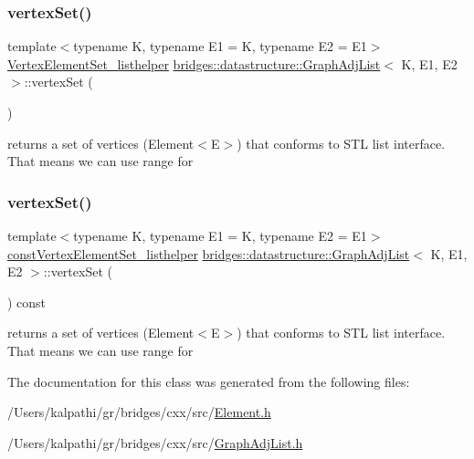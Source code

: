 \subsubsection{\texorpdfstring{vertexSet()}{vertexSet()}\hspace{0.1cm}{\footnotesize\ttfamily [1/2]}}
{\footnotesize\ttfamily template$<$typename K, typename E1 = K, typename E2 = E1$>$ \\
\mbox{\hyperlink{classbridges_1_1datastructure_1_1_graph_adj_list_1_1_vertex_element_set__listhelper}{Vertex\+Element\+Set\+\_\+listhelper}} \mbox{\hyperlink{classbridges_1_1datastructure_1_1_graph_adj_list}{bridges\+::datastructure\+::\+Graph\+Adj\+List}}$<$ K, E1, E2 $>$\+::vertex\+Set (\begin{DoxyParamCaption}{ }\end{DoxyParamCaption})\hspace{0.3cm}{\ttfamily [inline]}}



returns a set of vertices (Element$<$\+E$>$) that conforms to S\+TL list interface. That means we can use range for 

\mbox{\label{classbridges_1_1datastructure_1_1_graph_adj_list_a5ef96f5df21b2f9743b7bb79c10cf090}} 
\subsubsection{\texorpdfstring{vertexSet()}{vertexSet()}\hspace{0.1cm}{\footnotesize\ttfamily [2/2]}}
{\footnotesize\ttfamily template$<$typename K, typename E1 = K, typename E2 = E1$>$ \\
\mbox{\hyperlink{classbridges_1_1datastructure_1_1_graph_adj_list_1_1const_vertex_element_set__listhelper}{const\+Vertex\+Element\+Set\+\_\+listhelper}} \mbox{\hyperlink{classbridges_1_1datastructure_1_1_graph_adj_list}{bridges\+::datastructure\+::\+Graph\+Adj\+List}}$<$ K, E1, E2 $>$\+::vertex\+Set (\begin{DoxyParamCaption}{ }\end{DoxyParamCaption}) const\hspace{0.3cm}{\ttfamily [inline]}}



returns a set of vertices (Element$<$\+E$>$) that conforms to S\+TL list interface. That means we can use range for 



The documentation for this class was generated from the following files\+:\begin{DoxyCompactItemize}
\item 
/\+Users/kalpathi/gr/bridges/cxx/src/\mbox{\hyperlink{_element_8h}{Element.\+h}}\item 
/\+Users/kalpathi/gr/bridges/cxx/src/\mbox{\hyperlink{_graph_adj_list_8h}{Graph\+Adj\+List.\+h}}\end{DoxyCompactItemize}
